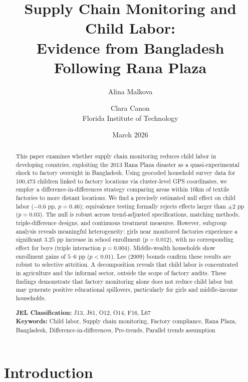 \documentclass[12pt]{article}
\title{Supply Chain Monitoring and Child Labor: \\Evidence from Bangladesh Following Rana Plaza\\[1em]
}
\author{Alina Malkova \and Clara Canon \\[0.5em]
\small Florida Institute of Technology}
\date{March 2026}
\begin{document}
\maketitle


\begin{abstract}
\noindent This paper examines whether supply chain monitoring reduces child labor in developing countries, exploiting the 2013 Rana Plaza disaster as a quasi-experimental shock to factory oversight in Bangladesh. Using geocoded household survey data for 100,473 children linked to factory locations via cluster-level GPS coordinates, we employ a difference-in-differences strategy comparing areas within 10km of textile factories to more distant locations. We find a precisely estimated null effect on child labor ($-0.6$ pp, $p = 0.46$); equivalence testing formally rejects effects larger than $\pm 2$ pp ($p = 0.03$). The null is robust across trend-adjusted specifications, matching methods, triple-difference designs, and continuous treatment measures. However, subgroup analysis reveals meaningful heterogeneity: girls near monitored factories experience a significant $3.25$ pp increase in school enrollment ($p = 0.012$), with no corresponding effect for boys (triple interaction $p = 0.004$). Middle-wealth households show enrollment gains of $5$--$6$ pp ($p < 0.01$). Lee (2009) bounds confirm these results are robust to selective attrition. A decomposition reveals that child labor is concentrated in agriculture and the informal sector, outside the scope of factory audits. These findings demonstrate that factory monitoring alone does not reduce child labor but may generate positive educational spillovers, particularly for girls and middle-income households.

\vspace{0.5cm}
\noindent \textbf{JEL Classification:} J13, J81, O12, O14, F16, L67\\
\textbf{Keywords:} Child labor, Supply chain monitoring, Factory compliance, Rana Plaza, Bangladesh, Difference-in-differences, Pre-trends, Parallel trends assumption
\end{abstract}

\clearpage
\tableofcontents
\clearpage

\section{Introduction}
\end{document}
